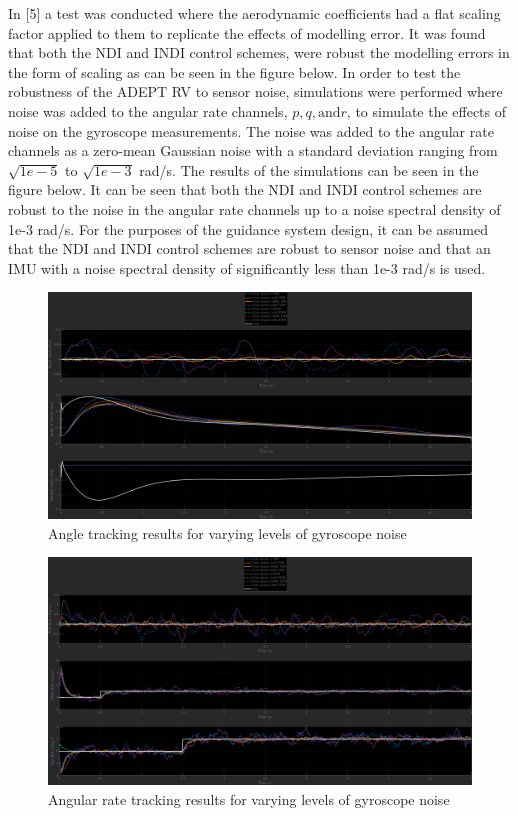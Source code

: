 \documentclass[12pt]{article}
\numberwithin{equation}{section}
\numberwithin{figure}{section}
\numberwithin{table}{section}
\begin{document}
In [5] a test was conducted where the aerodynamic coefficients had a flat scaling factor applied to them to replicate the effects of modelling error. It was found that both the NDI and INDI control schemes, were robust the modelling errors in the form of scaling as can be seen in the figure below. In order to test the robustness of the ADEPT RV to sensor noise, simulations were performed where noise was added to the angular rate channels, $p, q, \text{and} r$, to simulate the effects of noise on the gyroscope measurements. The noise was added to the angular rate channels as a zero-mean Gaussian noise with a standard deviation ranging from $ \sqrt{1e-5}$ to $\sqrt{1e-3}$ rad/s. The results of the simulations can be seen in the figure below. It can be seen that both the NDI and INDI control schemes are robust to the noise in the angular rate channels up to a noise spectral density of 1e-3 rad/s. For the purposes of the guidance system design, it can be assumed that the NDI and INDI control schemes are robust to sensor noise and that an IMU with a noise spectral density of significantly less than 1e-3 rad/s is used.

\begin{figure}[H]
  \centering
  \includegraphics[width=1\textwidth]{Figures/AnglesGuidance.png}
  \caption{Angle tracking results for varying levels of gyroscope noise}
  \label{fig:Angle_Noise}
\end{figure}

\begin{figure}[H]
  \centering
  \includegraphics[width=1\textwidth]{Figures/AngularAccelRate.png}
  \caption{Angular rate tracking results for varying levels of gyroscope noise}
  \label{fig:Angular_Rate_Noise}
\end{figure}
\end{document}
